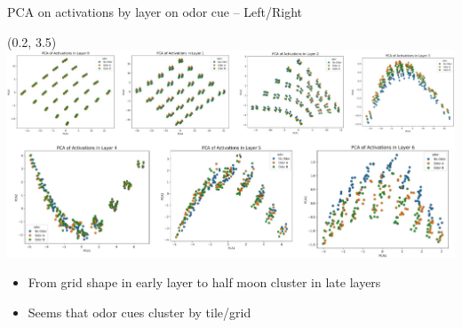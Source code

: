 \documentclass[bigger]{beamer}
\begin{document}
\begin{frame}[label={sec:orge0582c6}]{PCA on activations by layer on odor cue -- Left/Right}
\begin{textblock}{15}(0.2, 3.5)%
\includegraphics[height=0.68\textheight, keepaspectratio]{medias/PCA-layers-activations-cue-LeftRight.png}
\vspace{-2em}
\footnotesize
\begin{itemize}
\setlength\itemsep{0em}
\item From grid shape in early layer to half moon cluster in late layers
\item Seems that odor cues cluster by tile/grid
\end{itemize}
\end{textblock}
\end{frame}
\end{document}
